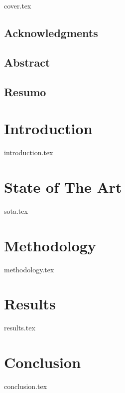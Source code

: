 \documentclass[a4paper, 12pt]{report}
\begin{document}
{cover.tex}
\listoffigures
\newpage
\listoftables
\newpage
\tableofcontents
\frontmatter
\section*{Acknowledgments}

\newpage
\section*{Abstract}

\newpage
\section*{Resumo}

\mainmatter


\newpage
\chapter{Introduction}
{introduction.tex}

\newpage
\chapter{State of The Art}
{sota.tex}

\newpage
\chapter{Methodology}
{methodology.tex}
\newpage
\chapter{Results}
{results.tex}

\newpage
\chapter{Conclusion}
{conclusion.tex}

\newpage
\printbibliography
\end{document}
